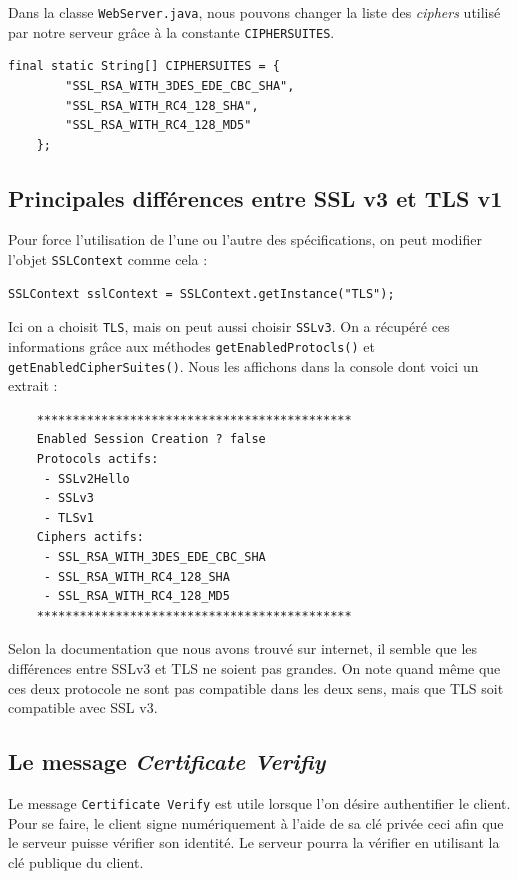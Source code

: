 \documentclass[10pt,a4paper,titlepage]{article}
\begin{document}
Dans la classe \texttt{WebServer.java}, nous pouvons changer la liste des \emph{ciphers} utilisé par notre serveur grâce à la constante \texttt{CIPHERSUITES}.

\begin{lstlisting}[frame=trBL]
	final static String[] CIPHERSUITES = {
		"SSL_RSA_WITH_3DES_EDE_CBC_SHA",  
		"SSL_RSA_WITH_RC4_128_SHA",
		"SSL_RSA_WITH_RC4_128_MD5"
	};
\end{lstlisting}

\subsection{Principales différences entre SSL v3 et TLS v1}

Pour force l'utilisation de l'une ou l'autre des spécifications, on peut modifier l'objet \texttt{SSLContext} comme cela :

\begin{lstlisting}[frame=trBL]
SSLContext sslContext = SSLContext.getInstance("TLS");
\end{lstlisting}

Ici on a choisit \texttt{TLS}, mais on peut aussi choisir \texttt{SSLv3}. On a récupéré ces informations grâce aux méthodes \texttt{getEnabledProtocls()} et \texttt{getEnabledCipherSuites()}. Nous les affichons dans la console dont voici un extrait : 

\begin{verbatim}
	********************************************
	Enabled Session Creation ? false
	Protocols actifs:
	 - SSLv2Hello
	 - SSLv3
	 - TLSv1
	Ciphers actifs:
	 - SSL_RSA_WITH_3DES_EDE_CBC_SHA
	 - SSL_RSA_WITH_RC4_128_SHA
	 - SSL_RSA_WITH_RC4_128_MD5
	********************************************
\end{verbatim}

Selon la documentation que nous avons trouvé sur internet, il semble que les différences entre SSLv3 et TLS ne soient pas grandes. On note quand même que ces deux protocole ne sont pas compatible dans les deux sens, mais que TLS soit compatible avec SSL v3.

\subsection{Le message \emph{Certificate Verifiy}}

Le message \texttt{Certificate Verify} est utile lorsque l'on désire authentifier le client. Pour se faire, le client signe numériquement à l'aide de sa clé privée ceci afin que le serveur puisse vérifier son identité. Le serveur pourra la vérifier en utilisant la clé publique du client.
\end{document}
